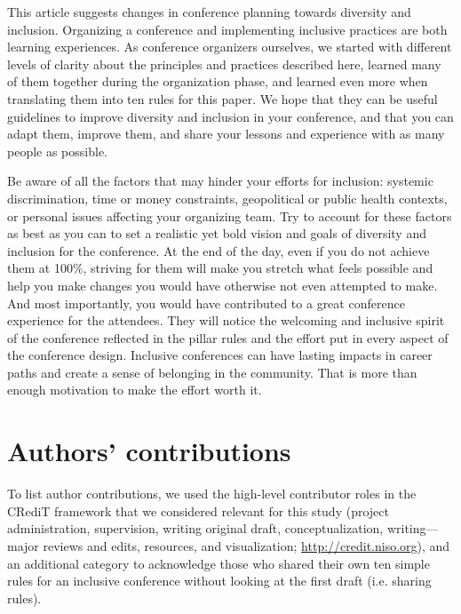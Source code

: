 \documentclass[10pt,letterpaper]{article}
\begin{document}
This article suggests changes in conference planning towards diversity and inclusion. 
Organizing a conference and implementing inclusive practices are both learning experiences.
As conference organizers ourselves, we started with different levels of clarity about the principles and practices described here, learned many of them together during the organization phase, and learned even more when translating them into ten rules for this paper. 
We hope that they can be useful guidelines to improve diversity and inclusion in your conference, and that you can adapt them, improve them, and share your lessons and experience with as many people as possible. 

Be aware of all the factors that may hinder your efforts for inclusion: systemic discrimination, time or money constraints, geopolitical or public health contexts, or personal issues affecting your organizing team. 
Try to account for these factors as best as you can to set a realistic yet bold vision and goals of diversity and inclusion for the conference.
At the end of the day, even if you do not achieve them at 100\%, striving for them will make you stretch what feels possible and help you make changes you would have otherwise not even attempted to make. 
And most importantly, you would have contributed to a great conference experience for the attendees. 
They will notice the welcoming and inclusive spirit of the conference reflected in the pillar rules and the effort put in every aspect of the conference design. 
Inclusive conferences can have lasting impacts in career paths and create a sense of belonging in the community. 
That is more than enough motivation to make the effort worth it. 


\section*{Authors' contributions}

To list author contributions, we used the high-level contributor roles in the CRediT framework that we considered relevant for this study (project administration, supervision, writing original draft, conceptualization, writing—major reviews and edits, resources, and visualization; \url{http://credit.niso.org}), and an additional category to acknowledge those who shared their own ten simple rules for an inclusive conference without looking at the first draft (i.e. sharing rules).
\end{document}
